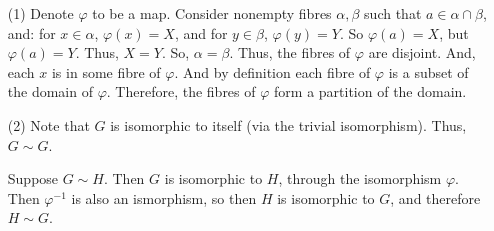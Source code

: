 %
%
\begin{itemize}
\item[(1)]
Denote $\varphi$ to be a map. Consider nonempty fibres $\alpha, \beta$ such that $a \in \alpha \cap \beta$, and: for $x \in \alpha$, $\varphi(x) = X$, and for $y \in \beta$, $\varphi(y) = Y$. So $\varphi(a) = X$, but $\varphi(a) = Y$. Thus, $X = Y$. So, $\alpha = \beta$. Thus, the fibres of $\varphi$ are disjoint.
And, each $x$ is in some fibre of $\varphi$. And by definition each fibre of $\varphi$ is a subset of the domain of $\varphi$. Therefore, the fibres of $\varphi$ form a partition of the domain.
\item[(2)]
Note that $G$ is isomorphic to itself (via the trivial isomorphism). Thus, $G \sim G$.

Suppose $G \sim H$. Then $G$ is isomorphic to $H$, through the isomorphism $\varphi$. Then $\varphi^{-1}$ is also an ismorphism, so then $H$ is isomorphic to $G$, and therefore $H \sim G$.


\end{itemize}
